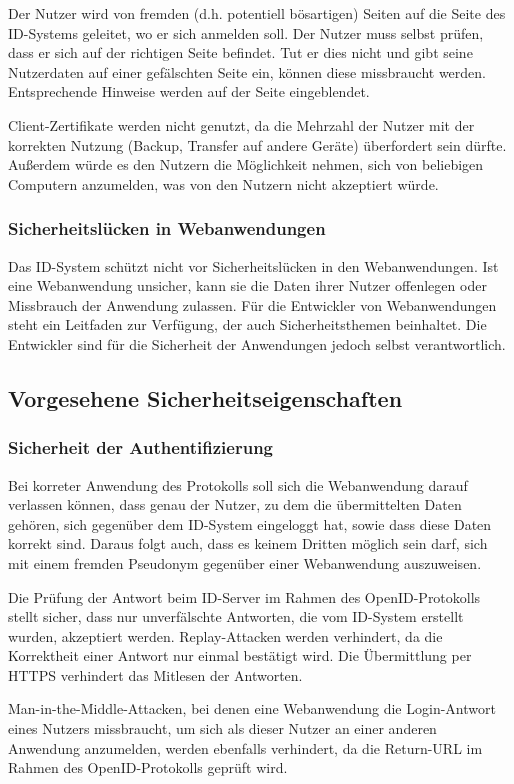 Der Nutzer wird von fremden (d.h. potentiell bösartigen) Seiten auf die Seite des ID-Systems geleitet, wo er sich anmelden soll.
Der Nutzer muss selbst prüfen, dass er sich auf der richtigen Seite befindet.
Tut er dies nicht und gibt seine Nutzerdaten auf einer gefälschten Seite ein, können diese missbraucht werden.
Entsprechende Hinweise werden auf der Seite eingeblendet.

Client-Zertifikate werden nicht genutzt, da die Mehrzahl der Nutzer mit der korrekten Nutzung (Backup, Transfer auf andere Geräte) überfordert sein dürfte.
Außerdem würde es den Nutzern die Möglichkeit nehmen, sich von beliebigen Computern anzumelden, was von den Nutzern nicht akzeptiert würde.

\subsubsection{Sicherheitslücken in Webanwendungen}
Das ID-System schützt nicht vor Sicherheitslücken in den Webanwendungen.
Ist eine Webanwendung unsicher, kann sie die Daten ihrer Nutzer offenlegen oder Missbrauch der Anwendung zulassen.
Für die Entwickler von Webanwendungen steht ein Leitfaden zur Verfügung, der auch Sicherheitsthemen beinhaltet.
Die Entwickler sind für die Sicherheit der Anwendungen jedoch selbst verantwortlich.

\subsection{Vorgesehene Sicherheitseigenschaften}
\subsubsection{Sicherheit der Authentifizierung}
Bei korreter Anwendung des Protokolls soll sich die Webanwendung darauf verlassen können,
dass genau der Nutzer, zu dem die übermittelten Daten gehören, sich gegenüber dem ID-System eingeloggt hat,
sowie dass diese Daten korrekt sind.
Daraus folgt auch, dass es keinem Dritten möglich sein darf, sich mit einem fremden Pseudonym gegenüber einer Webanwendung auszuweisen.

Die Prüfung der Antwort beim ID-Server im Rahmen des OpenID-Protokolls stellt sicher, dass nur unverfälschte Antworten, die vom ID-System erstellt wurden, akzeptiert werden.
Replay-Attacken werden verhindert, da die Korrektheit einer Antwort nur einmal bestätigt wird.
Die Übermittlung per HTTPS verhindert das Mitlesen der Antworten.

Man-in-the-Middle-Attacken, bei denen eine Webanwendung die Login-Antwort eines Nutzers missbraucht,
um sich als dieser Nutzer an einer anderen Anwendung anzumelden, werden ebenfalls verhindert,
da die Return-URL im Rahmen des OpenID-Protokolls geprüft wird.

